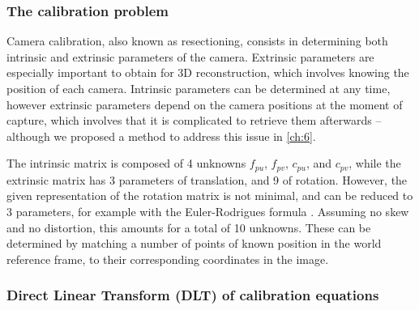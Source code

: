 \subsubsection{The calibration problem}

Camera calibration, also known as resectioning, consists in determining both intrinsic and extrinsic parameters of the camera. Extrinsic parameters are especially important to obtain for 3D reconstruction, which involves knowing the position of each camera. Intrinsic parameters can be determined at any time, however extrinsic parameters depend on the camera positions at the moment of capture, which involves that it is complicated to retrieve them afterwards -- although we proposed a method to address this issue in \autoref{ch:6}.

The intrinsic matrix is composed of 4 unknowns $f_{pu}$, $f_{pv}$, $c_{pu}$, and $c_{pv}$, while the extrinsic matrix has 3 parameters of translation, and 9 of rotation. However, the given representation of the rotation matrix is not minimal, and can be reduced to 3 parameters, for example with the Euler-Rodrigues formula \cite{Gallego2015}. Assuming no skew and no distortion, this amounts for a total of 10 unknowns. These can be determined by matching a number of points of known position in the world reference frame, to their corresponding coordinates in the image. 

\subsubsection{Direct Linear Transform (DLT) of calibration equations}

